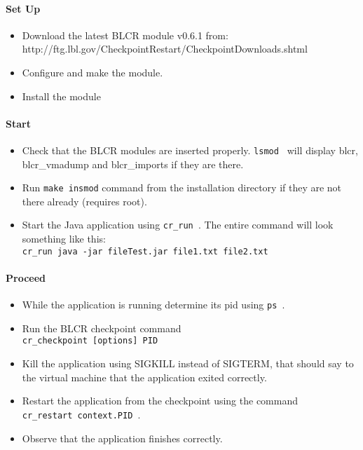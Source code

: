 \paragraph{Set Up}
\begin{itemize}
\item Download the latest BLCR module v0.6.1 from:\\
	http://ftg.lbl.gov/CheckpointRestart/CheckpointDownloads.shtml
\item Configure and make the module.
\item Install the module
\end{itemize}

\paragraph{Start}

\begin{itemize}
\item Check that the BLCR modules are inserted properly. {\tt lsmod } will display blcr, blcr\_vmadump and blcr\_imports if they are there.
\item Run {\tt make insmod} command from the installation directory if they are not there already (requires root).
\item Start the Java application using {\tt cr\_run }. The entire command will look something like this:\\
	{\tt cr\_run java -jar fileTest.jar file1.txt file2.txt}
\end{itemize}


\paragraph{Proceed}

\begin{itemize}
\item While the application is running determine its pid using {\tt ps }.
\item Run the BLCR checkpoint command\\
	{\tt cr\_checkpoint [options] PID} 
\item Kill the application using SIGKILL instead of SIGTERM, that should say to the virtual machine that the application exited correctly.
\item Restart the application from the checkpoint using the command\\
	{\tt cr\_restart context.PID }.
\item Observe that the application finishes correctly.
\end{itemize}

